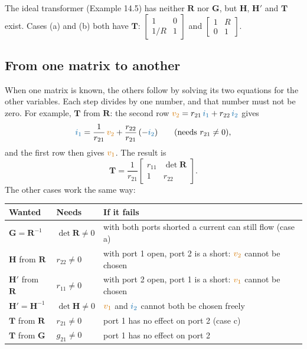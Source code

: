 \documentclass[11pt,a4paper]{article}
\newcommand{\Icol}[1]{\textcolor{ccur}{#1}}
\newcommand{\Vcol}[1]{\textcolor{cvolt}{#1}}
\newcommand{\vone}{\Vcol{v_1}}  \newcommand{\vtwo}{\Vcol{v_2}}
\newcommand{\ione}{\Icol{i_1}}  \newcommand{\itwo}{\Icol{i_2}}
\newcommand{\Rm}{\mathbf{R}}  \newcommand{\Gm}{\mathbf{G}}
\newcommand{\Hm}{\mathbf{H}}  \newcommand{\Tm}{\mathbf{T}}
\begin{document}
The ideal transformer (Example 14.5) has neither $\Rm$ nor $\Gm$, but $\Hm$, $\Hm'$ and $\Tm$
exist. Cases (a) and (b) both have $\Tm$: $\left[\begin{smallmatrix} 1 & 0\\ 1/R & 1 \end{smallmatrix}\right]$
and $\left[\begin{smallmatrix} 1 & R\\ 0 & 1 \end{smallmatrix}\right]$.

\subsection{From one matrix to another}

When one matrix is known, the others follow by solving its two equations for the other
variables. Each step divides by one number, and that number must not be zero. For example,
$\Tm$ from $\Rm$: the second row $\vtwo = r_{21}\,\ione + r_{22}\,\itwo$ gives
\[
  \ione = \frac{1}{r_{21}}\,\vtwo + \frac{r_{22}}{r_{21}}\,(-\itwo)
  \qquad\text{(needs } r_{21} \neq 0\text{)},
\]
and the first row then gives $\vone$. The result is
\[
  \Tm = \frac{1}{r_{21}} \begin{bmatrix} r_{11} & \det \Rm\\ 1 & r_{22} \end{bmatrix} .
\]
The other cases work the same way:
\begin{center}
\small
\renewcommand{\arraystretch}{1.4}
\begin{tabular}{@{}>{\raggedright}p{2.9cm} >{\raggedright}p{2.2cm} >{\raggedright\arraybackslash}p{7.2cm}@{}}
\toprule
\textbf{Wanted} & \textbf{Needs} & \textbf{If it fails}\\
\midrule
$\Gm = \Rm^{-1}$ & $\det \Rm \neq 0$ & with both ports shorted a current can still flow (case a)\\
$\Hm$ from $\Rm$ & $r_{22} \neq 0$ & with port 1 open, port 2 is a short: $\vtwo$ cannot be chosen\\
$\Hm'$ from $\Rm$ & $r_{11} \neq 0$ & with port 2 open, port 1 is a short: $\vone$ cannot be chosen\\
$\Hm' = \Hm^{-1}$ & $\det \Hm \neq 0$ & $\vone$ and $\itwo$ cannot both be chosen freely\\
$\Tm$ from $\Rm$ & $r_{21} \neq 0$ & port 1 has no effect on port 2 (case c)\\
$\Tm$ from $\Gm$ & $g_{21} \neq 0$ & port 1 has no effect on port 2\\
\bottomrule
\end{tabular}
\end{center}
\end{document}
